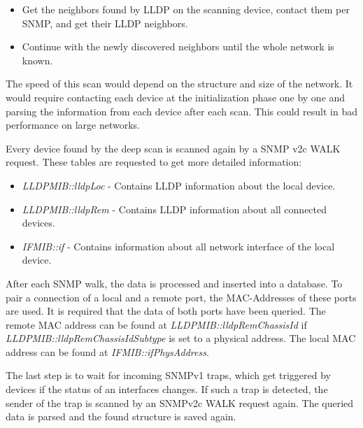 \begin{minipage}{\textwidth}
\begin{itemize}
    \item Get the neighbors found by LLDP on the scanning device, contact them per SNMP, and get their LLDP neighbors.
    \item Continue with the newly discovered neighbors until the whole network is known.
\end{itemize}
\end{minipage}

The speed of this scan would depend on the structure and size of the network. It would require contacting each device at the initialization phase one by one and parsing the information from each device after each scan. This could result in bad performance on large networks.

Every device found by the deep scan is scanned again by a SNMP v2c WALK request. These tables are requested to get more detailed information:

\begin{minipage}{\textwidth}
\begin{itemize}
    \item \textit{LLDPMIB::lldpLoc} - Contains LLDP information about the local device.
    \item \textit{LLDPMIB::lldpRem} - Contains LLDP information about all connected devices.
    \item \textit{IFMIB::if} - Contains information about all network interface of the local device.
\end{itemize}
\end{minipage}

After each SNMP walk, the data is processed and inserted into a database. To pair a connection of a local and a remote port, the MAC-Addresses of these ports are used. It is required that the data of both ports have been queried. The remote MAC address can be found at \textit{LLDPMIB::lldpRemChassisId} if \textit{LLDPMIB::lldpRemChassisIdSubtype} is set to a physical address. The local MAC address can be found at \textit{IFMIB::ifPhysAddress}.

The last step is to wait for incoming SNMPv1 traps, which get triggered by devices if the status of an interfaces changes. If such a trap is detected, the sender of the trap is scanned by an SNMPv2c WALK request again. The queried data is parsed and the found structure is saved again.